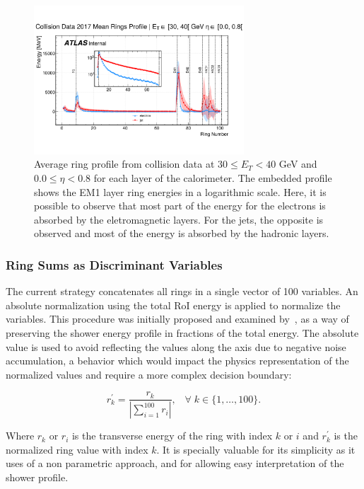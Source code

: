 \begin{figure}[!ht]
  \centering
  \includegraphics[width=0.7\textwidth]{sections/02_ringer/figures/reco_steps/data17_zee_mean_rings_profiles_et2_eta0.pdf}
  \caption{Average ring profile from collision data at $30 \leq E_T < 40$ GeV and $0.0 \leq \eta < 0.8$ for each layer of the calorimeter. The embedded profile shows the EM1 layer ring energies in a logarithmic scale. Here, it is possible to observe that most part of the energy for the electrons is absorbed by the eletromagnetic layers. For the jets, the opposite is observed and most of the energy is absorbed by the hadronic layers.}
  \label{fig:rings_profile}
\end{figure}

\subsubsection{Ring Sums as Discriminant Variables}

The current strategy concatenates all rings in a single vector of 100
variables. An absolute normalization using the total RoI energy is applied to normalize the variables. 
This procedure was initially proposed and examined by~\cite{1995_seixas_ringer}, as a way of preserving the shower energy profile in fractions of the total energy. 
The absolute value is used to avoid reflecting the values along the axis due to negative noise accumulation, a behavior which would impact the physics
representation of the normalized values and require a more complex decision
boundary:

\begin{equation}
  r^\prime_{k} = \frac{r_{k}}{| \sum\limits_{i=1}^{100} r_i
  |}, \;\;\;
    \forall \; k\in\{1,\dots,100\}.
\label{eq:ring_norm}
\end{equation}

Where $r_k$ or $r_i$ is the transverse energy of the ring with index $k$ or $i$ and $r^\prime_{k}$ is the normalized ring value with index $k$. It is specially valuable for its simplicity as it uses of a non parametric approach, and for allowing easy interpretation of the shower profile.



